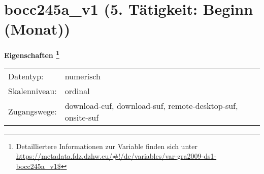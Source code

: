 
    \setcounter{footnote}{0}

    \vspace*{-1.8cm}
	\section{bocc245a\_v1 (5. Tätigkeit: Beginn (Monat))}
	\label{section:bocc245a_v1}



    \vspace*{0.5cm}
    \noindent\textbf{Eigenschaften
	\footnote{Detailliertere Informationen zur Variable finden sich unter
		\url{https://metadata.fdz.dzhw.eu/\#!/de/variables/var-gra2009-ds1-bocc245a_v1$}}}\\
	\begin{tabularx}{\hsize}{@{}lX}
	Datentyp: & numerisch \\
	Skalenniveau: & ordinal \\
	Zugangswege: &
	  download-cuf, 
	  download-suf, 
	  remote-desktop-suf, 
	  onsite-suf
 \\
    \end{tabularx}



